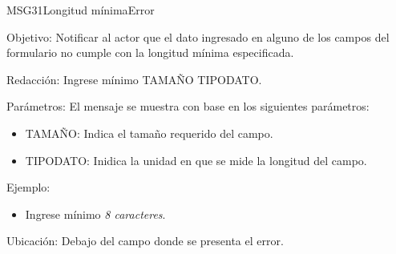 \begin{mensaje}{MSG31}{Longitud mínima}{Error}
	\item [Objetivo:] Notificar al actor que el dato ingresado en alguno de los campos del formulario no cumple con la longitud mínima especificada.
	\item[Redacción:] Ingrese mínimo TAMAÑO TIPODATO.
	\item[Parámetros:] El mensaje se muestra con base en los siguientes parámetros:
		\begin{itemize}
 			\item TAMAÑO: Indica el tamaño requerido del campo.
 			\item TIPODATO: Inidica la unidad en que se mide la longitud del campo.
		\end{itemize}
	\item[Ejemplo:] 
	\begin{itemize}
		\item Ingrese mínimo {\em 8 caracteres}.
	\end{itemize}
	\item [Ubicación:] Debajo del campo donde se presenta el error.
\end{mensaje}